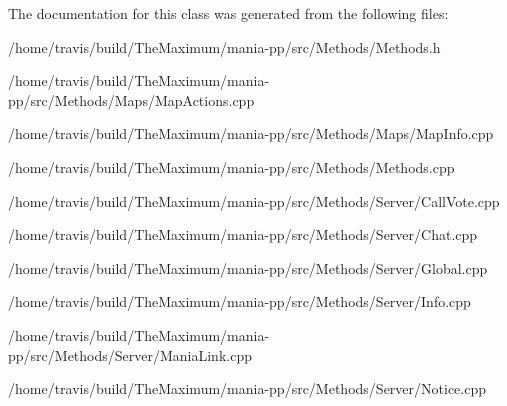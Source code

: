 The documentation for this class was generated from the following files\-:\begin{DoxyCompactItemize}
\item 
/home/travis/build/\-The\-Maximum/mania-\/pp/src/\-Methods/Methods.\-h\item 
/home/travis/build/\-The\-Maximum/mania-\/pp/src/\-Methods/\-Maps/Map\-Actions.\-cpp\item 
/home/travis/build/\-The\-Maximum/mania-\/pp/src/\-Methods/\-Maps/Map\-Info.\-cpp\item 
/home/travis/build/\-The\-Maximum/mania-\/pp/src/\-Methods/Methods.\-cpp\item 
/home/travis/build/\-The\-Maximum/mania-\/pp/src/\-Methods/\-Server/Call\-Vote.\-cpp\item 
/home/travis/build/\-The\-Maximum/mania-\/pp/src/\-Methods/\-Server/Chat.\-cpp\item 
/home/travis/build/\-The\-Maximum/mania-\/pp/src/\-Methods/\-Server/Global.\-cpp\item 
/home/travis/build/\-The\-Maximum/mania-\/pp/src/\-Methods/\-Server/Info.\-cpp\item 
/home/travis/build/\-The\-Maximum/mania-\/pp/src/\-Methods/\-Server/Mania\-Link.\-cpp\item 
/home/travis/build/\-The\-Maximum/mania-\/pp/src/\-Methods/\-Server/Notice.\-cpp\end{DoxyCompactItemize}
